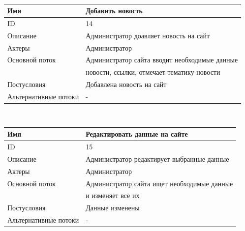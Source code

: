 \begin{center}
\begin{tabular}{|l|l|}
        \hline
    \end{tabular}\\
    \vspace{0.5cm}
    \begin{tabular}{|l|l|}
        \hline
        Имя                   & Добавить новость                              \\
        \hline
        ID                    & 14                                            \\
        \hline
        Описание              & Администратор доавляет новость на сайт        \\
        \hline
        Актеры                & Администратор                                 \\
        \hline
        Основной поток        & Администратор сайта вводит необходимые данные \\
        & новости, ссылки, отмечает тематику новости    \\
        \hline
        Постусловия           & Добавлена новость на сайт                     \\
        \hline
        Альтернативные потоки & -                                             \\
        \hline
    \end{tabular}\\
    \vspace{0.5cm}
    \begin{tabular}{|l|l|}
        \hline
        Имя                   & Редактировать данные на сайте               \\
        \hline
        ID                    & 15                                          \\
        \hline
        Описание              & Администратор редактирует выбранные данные  \\
        \hline
        Актеры                & Администратор                               \\
        \hline
        Основной поток        & Администратор сайта ищет необходимые данные \\
        & и изменяет все их                           \\
        \hline
        Постусловия           & Данные изменены                             \\
        \hline
        Альтернативные потоки & -                                           \\
        \hline
    \end{tabular}\\
\end{center}
